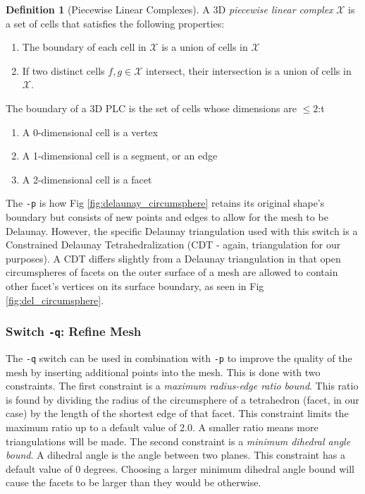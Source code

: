 \documentclass[ma]{uncgdissertationexp}
\theoremstyle{plain}
\theoremstyle{definition}
\newtheorem{definition}[theorem]{Definition}
\theoremstyle{remark}
\begin{document}
\begin{definition}[Piecewise Linear Complexes]
\par A 3D \textit{piecewise linear complex} $\mathcal{X}$ is a set of cells that satisfies the following properties:
\begin{enumerate}
\item The boundary of each cell in $\mathcal{X}$ is a union of cells in $\mathcal{X}$
\item If two distinct cells $f, g \in \mathcal{X}$ intersect, their intersection is a union of cells in $\mathcal{X}$.
\end{enumerate}
\par The boundary of a 3D PLC is the set of cells whose dimensions are $\leq 2$:t
\begin{enumerate}
\item A 0-dimensional cell is a vertex
\item A 1-dimensional cell is a segment, or an edge
\item A 2-dimensional cell is a facet
\end{enumerate}
\end{definition}

The \verb"-p" is how Fig \ref{fig:delaunay_circumsphere} retains its original shape's boundary but consists of new points and edges to allow for the mesh to be Delaunay. However, the specific Delaunay triangulation used with this switch is a Constrained Delaunay Tetrahedralization (CDT - again, triangulation for our purposes). A CDT differs slightly from a Delaunay triangulation in that open circumspheres of facets on the outer surface of a mesh are allowed to contain other facet's vertices on its surface boundary, as seen in Fig \ref{fig:del_circumsphere}.

\cprotect\subsubsection{Switch \verb+-q+: Refine Mesh}
\par The \verb"-q" switch can be used in combination with \verb"-p" to improve the quality of the mesh by inserting additional points into the mesh. This is done with two constraints. The first constraint is a \textit{maximum radius-edge ratio bound}. This ratio is found by dividing the radius of the circumsphere of a tetrahedron (facet, in our case) by the length of the shortest edge of that facet. This constraint limits the maximum ratio up to a default value of 2.0. A smaller ratio means more triangulations will be made. The second constraint is a \textit{minimum dihedral angle bound}. A dihedral angle is the angle between two planes. This constraint has a default value of 0 degrees. Choosing a larger minimum dihedral angle bound will cause the facets to be larger than they would be otherwise.
\end{document}
